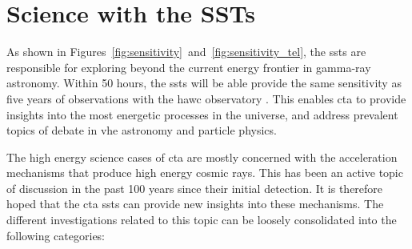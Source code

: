 \section{Science with the SSTs}

As shown in Figures~\ref{fig:sensitivity}~and~\ref{fig:sensitivity_tel}, the \glspl{sst} are responsible for exploring beyond the current energy frontier in gamma-ray astronomy. Within 50 hours, the \glspl{sst} will be able provide the same sensitivity as five years of observations with the \gls{hawc} observatory \cite{Consortium2018}. This enables \gls{cta} to provide insights into the most energetic processes in the universe, and address prevalent topics of debate in \gls{vhe} astronomy and particle physics.

The high energy science cases of \gls{cta} are mostly concerned with the acceleration mechanisms that produce high energy cosmic rays. This has been an active topic of discussion in the past 100 years since their initial detection. It is therefore hoped that the \gls{cta} \glspl{sst} can provide new insights into these mechanisms. The different investigations related to this topic can be loosely consolidated into the following categories:
